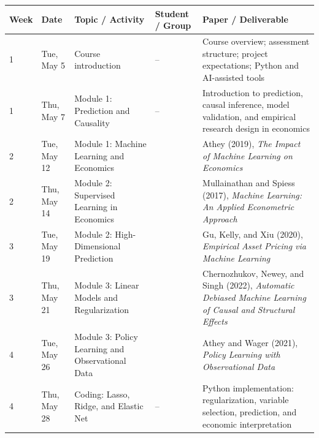 \documentclass[11pt]{article}
\begin{document}
\begin{adjustbox}{max width=\textwidth, max totalheight=0.84\textheight, keepaspectratio}
\scriptsize
\begin{tabularx}{\textwidth}{@{}L{0.045\textwidth} L{0.075\textwidth} L{0.20\textwidth} L{0.13\textwidth} X@{}}
\toprule
\textbf{Week} & \textbf{Date} & \textbf{Topic / Activity} & \textbf{Student / Group} & \textbf{Paper / Deliverable} \\
\midrule

1 & Tue, May 5 & Course introduction & -- & Course overview; assessment structure; project expectations; Python and AI-assisted tools \\

1 & Thu, May 7 & Module 1: Prediction and Causality & -- & Introduction to prediction, causal inference, model validation, and empirical research design in economics \\

2 & Tue, May 12 & Module 1: Machine Learning and Economics & \underline{\hspace{2.1cm}} & Athey (2019), \textit{The Impact of Machine Learning on Economics} \\

2 & Thu, May 14 & Module 2: Supervised Learning in Economics & \underline{\hspace{2.1cm}} & Mullainathan and Spiess (2017), \textit{Machine Learning: An Applied Econometric Approach} \\

3 & Tue, May 19 & Module 2: High-Dimensional Prediction & \underline{\hspace{2.1cm}} & Gu, Kelly, and Xiu (2020), \textit{Empirical Asset Pricing via Machine Learning} \\

3 & Thu, May 21 & Module 3: Linear Models and Regularization & \underline{\hspace{2.1cm}} & Chernozhukov, Newey, and Singh (2022), \textit{Automatic Debiased Machine Learning of Causal and Structural Effects} \\

4 & Tue, May 26 & Module 3: Policy Learning and Observational Data & \underline{\hspace{2.1cm}} & Athey and Wager (2021), \textit{Policy Learning with Observational Data} \\

4 & Thu, May 28 & Coding: Lasso, Ridge, and Elastic Net & -- & Python implementation: regularization, variable selection, prediction, and economic interpretation \\


\end{tabularx}
\end{adjustbox}
\end{document}
